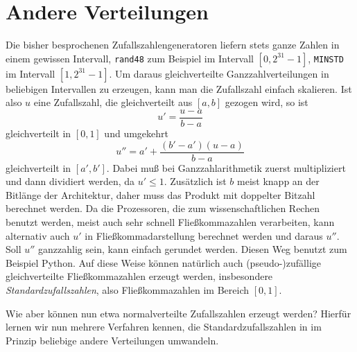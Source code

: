 \section{Andere Verteilungen}

Die bisher besprochenen Zufallszahlengeneratoren liefern stets ganze
Zahlen in einem gewissen Intervall, \texttt{rand48} zum Beispiel
im Intervall $[0,2^{31}-1]$, \texttt{MINSTD} im Intervall
$[1,2^{31}-1]$. Um daraus gleichverteilte Ganzzahlverteilungen in
beliebigen Intervallen zu erzeugen, kann man die Zufallszahl einfach
skalieren. Ist also $u$ eine Zufallszahl, die gleichverteilt aus
$[a,b]$ gezogen wird, so ist
\begin{equation}
  u' = \frac{u - a}{b-a}
\end{equation}
gleichverteilt in $[0,1]$ und umgekehrt
\begin{equation}
  u'' = a' + \frac{(b'-a')(u - a)}{b-a}
\end{equation}
gleichverteilt in $[a',b']$. Dabei muß bei Ganzzahlarithmetik zuerst
multipliziert und dann dividiert werden, da $u' \le 1$. Zusätzlich ist
$b$ meist knapp an der Bitlänge der Architektur, daher muss das
Produkt mit doppelter Bitzahl berechnet werden. Da die Prozessoren,
die zum wissenschaftlichen Rechen benutzt werden, meist auch sehr
schnell Fließkommazahlen verarbeiten, kann alternativ auch $u'$ in
Fließkommadarstellung berechnet werden und daraus $u''$. Soll $u''$
ganzzahlig sein, kann einfach gerundet werden. Diesen Weg benutzt zum
Beispiel Python. Auf diese Weise können natürlich auch
(pseudo-)zufällige gleichverteilte Fließkommazahlen erzeugt werden,
insbesondere \emph{Standardzufallszahlen},
also Fließkommazahlen im Bereich $[0,1]$.

Wie aber können nun etwa normalverteilte Zufallszahlen erzeugt werden?
Hierfür lernen wir nun mehrere Verfahren kennen, die
Standardzufallszahlen in im Prinzip beliebige andere Verteilungen
umwandeln.

\subsection{}

